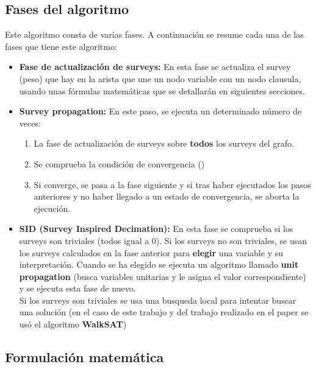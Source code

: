 \subsection{Fases del algoritmo}
Este algoritmo consta de varias fases.
A continuación se resume cada una de las fases que tiene este algoritmo:
\begin{itemize}
	\item \textbf{Fase de actualización de surveys:} En esta fase se actualiza el survey (peso) que hay en la arista que une un nodo variable con un nodo clausula, usando unas fórmulas matemáticas que se detallarán en siguientes secciones.
	\item \textbf{Survey propagation:} En este paso, se ejecuta un determinado número de veces:
	\begin{enumerate}
		\item La fase de actualización de surveys sobre \textbf{todos} los surveys del grafo.
		\item Se comprueba la condición de convergencia ()
		\item Si converge, se pasa a la fase siguiente y si tras haber ejecutados los pasos anteriores y no haber llegado a un estado de convergencia, se aborta la ejecución.
	\end{enumerate} 
	\item \textbf{SID (Survey Inspired Decimation):} En esta fase se comprueba si los surveys son triviales (todos igual a 0). Si los surveys no son triviales, se usan los surveys calculados en la fase anterior para \textbf{elegir} una variable y su interpretación. Cuando se ha elegido se ejecuta un algoritmo llamado \textbf{unit propagation} (busca variables unitarias y le asigna el valor correspondiente) y se ejecuta esta fase de nuevo.\\
	Si los surveys son triviales se usa una busqueda local para intentar buscar una solución (en el caso de este trabajo y del trabajo realizado en el paper se usó el algoritmo \textbf{WalkSAT})
\end{itemize}
\subsection{Formulación matemática}


